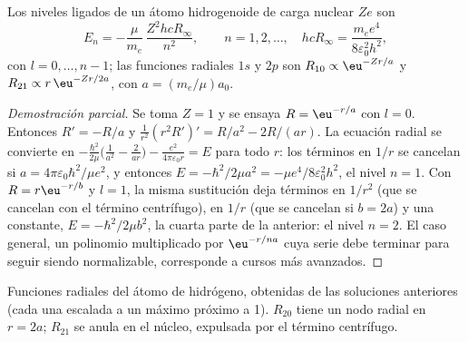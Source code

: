 \begin{theorem}\label{thm:b3:quantum-model-systems:hydrogen}
Los niveles ligados de un átomo hidrogenoide de carga nuclear $Ze$ son
\[
E_n = -\frac{\mu}{m_e}\,\frac{Z^2hcR_\infty}{n^2}, \qquad n = 1, 2, \dots,
\quad hcR_\infty = \frac{m_ee^4}{8\varepsilon_0^2h^2},
\]
con $l = 0, \dots, n - 1$; las funciones radiales $1s$ y $2p$ son $R_{10}
\propto \eu^{-Zr/a}$ y $R_{21} \propto r\,\eu^{-Zr/2a}$, con $a =
(m_e/\mu)a_0$.
\end{theorem}

\begin{proof}[Demostración parcial]
Se toma $Z = 1$ y se ensaya $R = \eu^{-r/a}$ con $l = 0$. Entonces $R' = -R/a$ y
$\frac{1}{r^2}(r^2R')' = R/a^2 - 2R/(ar)$. La ecuación radial se convierte en
$-\frac{\hbar^2}{2\mu}\big(\frac{1}{a^2} - \frac{2}{ar}\big) - \frac{e^2}{4\pi
\varepsilon_0r} = E$ para todo $r$: los términos en $1/r$ se cancelan si $a =
4\pi\varepsilon_0\hbar^2/\mu e^2$, y entonces $E = -\hbar^2/2\mu a^2 = -\mu
e^4/8\varepsilon_0^2h^2$, el nivel $n = 1$. Con $R = r\eu^{-r/b}$ y $l = 1$,
la misma sustitución deja términos en $1/r^2$ (que se cancelan con el
término centrífugo), en $1/r$ (que se cancelan si $b = 2a$) y una constante, $E =
-\hbar^2/2\mu b^2$, la cuarta parte de la anterior: el nivel $n = 2$. El caso
general, un polinomio multiplicado por $\eu^{-r/na}$ cuya serie debe terminar para seguir siendo
normalizable, corresponde a cursos más avanzados.
\end{proof}

\begin{omfigure}

{\small Funciones radiales del átomo de hidrógeno, obtenidas de las soluciones anteriores
(cada una escalada a un máximo próximo a 1). $R_{20}$ tiene un nodo radial en $r = 2a$;
$R_{21}$ se anula en el núcleo, expulsada por el término centrífugo.}
\end{omfigure}

